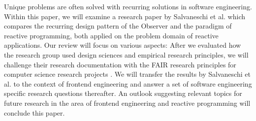 Unique problems are often solved with recurring solutions in software engineering. Within this paper, we will examine a research paper by Salvaneschi et al. \cite{7827078} which compares the recurring design pattern of the Observer \cite{gamma1995design} and the paradigm of reactive programming, both applied on the problem domain of reactive applications. Our review will focus on various aspects: After we evaluated how the research group used design sciences \cite{wieringa} and empirical research principles, we will challenge their research documentation with the FAIR research principles \cite{wilkinson:2016} for computer science research projects \cite{2019arXiv190805986H}. We will transfer the results by Salvaneschi et al. to the context of frontend engineering and answer a set of software engineering specific research questions thereafter. An outlook suggesting relevant topics for future research in the area of frontend engineering and reactive programming will conclude this paper.